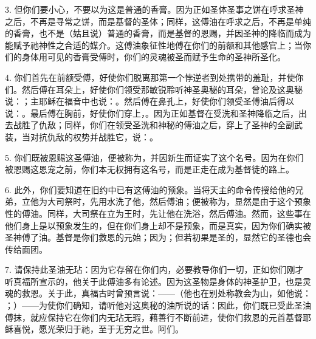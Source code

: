 3. 但你们要小心，不要以为这是普通的香膏。因为正如圣体圣事之饼在呼求圣神之后，不再是寻常之饼，而是基督的圣体；同样，这傅油在呼求之后，不再是单纯的香膏，也不是（姑且说）普通的香膏，而是基督的恩赐，并因圣神的降临而成为能赋予祂神性之合适的媒介。这傅油象征性地傅在你们的前额和其他感官上；当你们的身体用可见的香膏受傅时，你们的灵魂被圣而赋予生命的圣神所圣化。\par

4. 你们首先在前额受傅，好使你们脱离那第一个悖逆者到处携带的羞耻，并使你们。然后傅在耳朵上，好使你们领受那敏锐聆听神圣奥秘的耳朵，曾论及这奥秘说：；主耶稣在福音中也说：。然后傅在鼻孔上，好使你们领受圣傅油后得以说：。最后傅在胸前，好使你们穿上，。因为正如基督在受洗和圣神降临之后，出去战胜了仇敌；同样，你们在领受圣洗和神秘的傅油之后，穿上了圣神的全副武装，当对抗仇敌的权势并战胜它，说：。\par

5. 你们既被恩赐这圣傅油，便被称为，并因新生而证实了这个名号。因为在你们被恩赐这恩宠之前，你们本无权拥有这名号，而是正走在成为基督徒的路上。\par

6. 此外，你们要知道在旧约中已有这傅油的预象。当将天主的命令传授给他的兄弟，立他为大司祭时，先用水洗了他，然后傅油；便被称为，显然是由于这个预象性的傅油。同样，大司祭在立为王时，先让他在洗浴，然后傅油。然而，这些事在他们身上是以预象发生的，但在你们身上却不是预象，而是真实，因为你们确实被圣神傅了油。基督是你们救恩的元始；因为；但若初果是圣的，显然它的圣德也会传给面团。\par

7. 请保持此圣油无玷：因为它存留在你们内，必要教导你们一切，正如你们刚才听真福所宣示的，他关于此傅油多有论述。因为这圣物是身体的神圣护卫，也是灵魂的救恩。关于此，真福古时曾预言说：——（他也在别处称教会为山，如他说： ；）——为使你们确知，请听他对这奥秘的油所说的话：因此，你们既已受此圣油傅抹，就应保持它在你们内无玷无瑕，藉善行不断前进，使你们救恩的元首基督耶稣喜悦，愿光荣归于祂，至于无穷之世。阿们。\par

